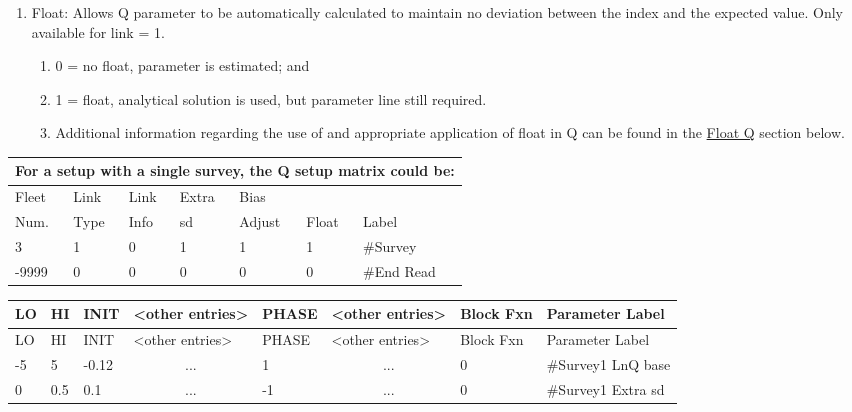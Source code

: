 \begin{enumerate}
\begin{enumerate}[label=(\alph*)]
	\end{enumerate}
	\item Float: Allows Q parameter to be automatically calculated to maintain no deviation between the index and the expected value. Only available for link = 1.
	\begin{enumerate}[label=(\alph*)]
		\item 0 = no float, parameter is estimated; and
		\item 1 = float, analytical solution is used, but parameter line still required.
		\item Additional information regarding the use of and appropriate application of float in Q can be found in the \hyperlink{FloatQ}{Float Q} section below.
	\end{enumerate}
\end{enumerate}

\begin{longtable}{p{2cm} p{2cm} p{2cm} p{2cm} p{2cm} p{1.3cm} p{2.3cm}}
	\multicolumn{7}{l}{For a setup with a single survey, the Q setup matrix could be:} \\
	\hline
	Fleet \Tstrut & Link & Link & Extra    & Bias   & & \\
	Num.          & Type & Info & \gls{sd} & Adjust & Float & Label \Bstrut\\
	\hline
	3 & 1 & 0 & 1 & 1 & 1 & \#Survey \Tstrut\\
	-9999 & 0 & 0 & 0 & 0 & 0 & \#End Read \Bstrut\\
	\hline
\end{longtable}


\begin{longtable}{p{1cm} p{1cm} p{1cm} p{1.5cm} p{1.5cm} p{1.5cm} p{1.75cm} p{4cm}}
	\hline
	LO \Tstrut & HI & INIT & <other entries> & PHASE & <other entries> & Block Fxn & Parameter Label \Bstrut\\
	\hline
	\endfirsthead

	\hline
	LO \Tstrut & HI & INIT & <other entries> & PHASE & <other entries> & Block Fxn & Parameter Label \Bstrut\\
	\hline
	\endhead

	\hline
	\endfoot
	\endlastfoot

	-5 & 5 & -0.12 & \multicolumn{1}{c}{...} &  1 & \multicolumn{1}{c}{...} & 0 & \#Survey1 LnQ base \Tstrut\\
	 0 & 0.5 & 0.1 & \multicolumn{1}{c}{...} & -1 & \multicolumn{1}{c}{...} & 0 & \#Survey1 Extra \gls{sd} \Bstrut\\
	\hline
\end{longtable}

